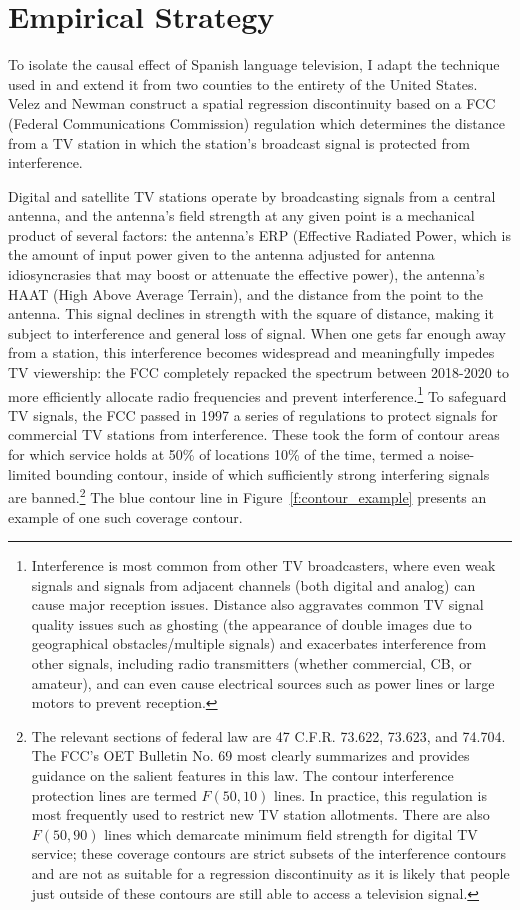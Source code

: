 \documentclass[11pt]{article}
\begin{document}
\section{Empirical Strategy}\label{s:rd}

To isolate the causal effect of Spanish language television, I adapt the technique used in \cite{velez_tuning_2019}  and extend it from two counties to the entirety of the United States. Velez and Newman construct a spatial regression discontinuity based on a FCC (Federal Communications Commission) regulation which determines the distance from a TV station in which the station's broadcast signal is protected from interference.

Digital and satellite TV stations operate by broadcasting signals from a central antenna, and the antenna's field strength at any given point is a mechanical product of several factors: the antenna's ERP (Effective Radiated Power, which is the amount of input power given to the antenna adjusted for antenna idiosyncrasies that may boost or attenuate the effective power), the antenna's HAAT (High Above Average Terrain), and the distance from the point to the antenna. This signal declines in strength with the square of distance, making it subject to interference and general loss of signal. When one gets far enough away from a station, this interference becomes widespread and meaningfully impedes TV viewership: the FCC completely repacked the spectrum between 2018-2020 to more efficiently allocate radio frequencies and prevent interference.\footnote{ Interference is most common from other TV broadcasters, where even weak signals and signals from adjacent channels (both digital and analog) can cause major reception issues. Distance also aggravates common TV signal quality issues such as ghosting (the appearance of double images due to geographical obstacles/multiple signals) and exacerbates interference from other signals, including radio transmitters (whether commercial, CB, or amateur), and can even cause electrical sources such as power lines or large motors to prevent reception.} To safeguard TV signals, the FCC passed in 1997 a series of regulations to protect signals for commercial TV stations from interference. These took the form of contour areas for which service holds at 50\% of locations 10\% of the time, termed a noise-limited bounding contour, inside of which sufficiently strong interfering signals are banned.\footnote{ The relevant sections of federal law are 47 C.F.R. 73.622, 73.623, and 74.704. The FCC's OET Bulletin No. 69 most clearly summarizes and provides guidance on the salient features in this law. The contour interference protection lines are termed $F(50,10)$ lines. In practice, this regulation is most frequently used to restrict new TV station allotments. There are also $F(50,90)$ lines which demarcate minimum field strength for digital TV service; these coverage contours are strict subsets of the interference contours and are not as suitable for a regression discontinuity as it is likely that people just outside of these contours are still able to access a television signal.} The blue contour line in Figure~\ref{f:contour_example} presents an example of one such coverage contour.
\end{document}
